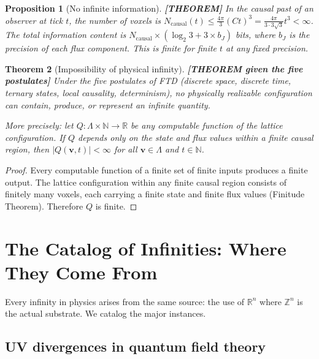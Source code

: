 \documentclass[11pt]{article}
\theoremstyle{tight}
\newtheorem{theorem}{Theorem}[section]
\newtheorem{proposition}[theorem]{Proposition}
\theoremstyle{plainroman}
\newcommand{\R}{\mathbb{R}}
\newcommand{\Z}{\mathbb{Z}}
\newcommand{\N}{\mathbb{N}}
\begin{document}
\begin{proposition}[No infinite information]\label{prop:info}
\textbf{[THEOREM]}
In the causal past of an observer at tick $t$, the number of voxels is $N_{\mathrm{causal}}(t)\le\frac{4\pi}{3}(Ct)^3=\frac{4\pi}{3\cdot 3\sqrt{3}}t^3<\infty$.
The total information content is $N_{\mathrm{causal}}\times(\log_2 3+3\times b_J)$ bits, where $b_J$ is the precision of each flux component.
This is finite for finite $t$ at any fixed precision.
\end{proposition}

\begin{theorem}[Impossibility of physical infinity]\label{thm:impossibility}
\textbf{[THEOREM given the five postulates]}
Under the five postulates of FTD (discrete space, discrete time, ternary states, local causality, determinism), no physically realizable configuration can contain, produce, or represent an infinite quantity.

More precisely: let $Q:\Lambda\times\N\to\R$ be any computable function of the lattice configuration.
If $Q$ depends only on the state and flux values within a finite causal region, then $|Q(\mathbf v,t)|<\infty$ for all $\mathbf v\in\Lambda$ and $t\in\N$.
\end{theorem}
\begin{proof}
Every computable function of a finite set of finite inputs produces a finite output.
The lattice configuration within any finite causal region consists of finitely many voxels, each carrying a finite state and finite flux values (Finitude Theorem).
Therefore $Q$ is finite.
\end{proof}

\section{The Catalog of Infinities: Where They Come From}

Every infinity in physics arises from the same source: the use of $\R^n$ where $\Z^n$ is the actual substrate.
We catalog the major instances.

\subsection{UV divergences in quantum field theory}
\end{document}
